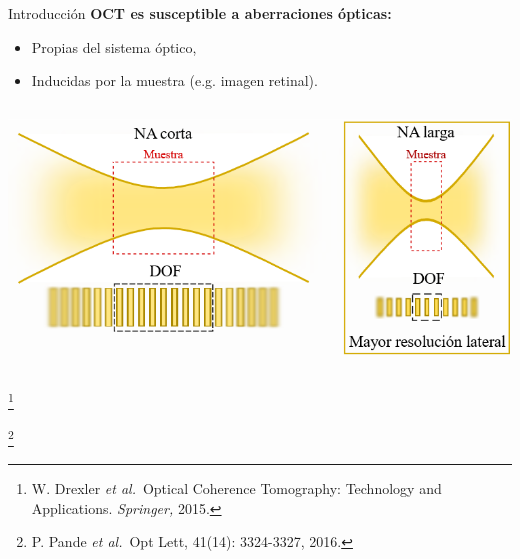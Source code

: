\documentclass[fleqn,10pt,aspectratio=169,dvipsnames]{beamer}
\newcommand\blfootnote[1]{%
	\begingroup
	\renewcommand\thefootnote{}\footnote{#1}%
	\addtocounter{footnote}{-1}%
	\endgroup
}
\newcommand{\etal}{\textit{et al.}\ }
\begin{document}
\begin{frame}[c]{Introducción}
\small
\textbf{OCT es susceptible a aberraciones ópticas:} \\
	\begin{itemize}
\item Propias del sistema óptico,
\item Inducidas por la muestra (e.g. imagen retinal). \\
	\end{itemize}

	\begin{centering}
		\begin{columns}
			\begin{column}{\textwidth}
\hspace*{0\baselineskip}
\includegraphics[width=.47\textwidth]{../Figuras/Confocal_gating.png}
\hspace*{.5\baselineskip}
			\end{column}
		\end{columns}
\vspace{\baselineskip}
	\end{centering}

\blfootnote{\tiny{W. Drexler \etal Optical Coherence Tomography: Technology and Applications. \emph{Springer,} 2015.}}
\blfootnote{\tiny{P. Pande \etal Opt Lett, 41(14): 3324-3327, 2016.}}
\end{frame}
\end{document}
